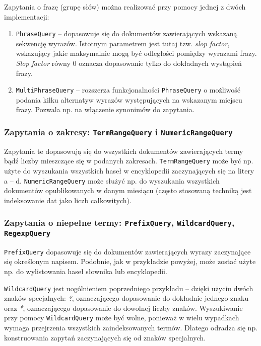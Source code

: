 Zapytania o frazę (grupę słów) można realizować przy pomocy jednej z dwóch implementacji:
\begin{enumerate}
 \item \texttt{PhraseQuery} -- dopasowuje się do dokumentów zawierających wskazaną sekwencję wyrazów. Istotnym parametrem jest tutaj tzw. \emph{slop factor}, wskazujący jakie maksymalnie mogą być odległości pomiędzy wyrazami frazy. \emph{Slop factor} równy 0 oznacza dopasowanie tylko do dokładnych wystąpień frazy. 
 \item \texttt{MultiPhraseQuery} -- rozszerza funkcjonalności \texttt{PhraseQuery} o możliwość podania kilku alternatyw wyrazów występujących na wskazanym miejscu frazy. Pozwala np. na włączenie synonimów do zapytania. 
\end{enumerate}

\subsubsection{Zapytania o zakresy: \texttt{TermRangeQuery} i \texttt{NumericRangeQuery}}

Zapytania te dopasowują się do wszystkich dokumentów zawierających termy bądź liczby mieszczące się w podanych zakresach. \texttt{TermRangeQuery} może być np. użyte do wyszukania wszystkich haseł w encyklopedii zaczynających się na litery a -- d. \texttt{NumericRangeQuery} może służyć np. do wyszukania wszystkich dokumentów opublikowanych w danym miesiącu (często stosowaną techniką jest indeksowanie dat jako liczb całkowitych).

\subsubsection{Zapytania o niepełne termy: \texttt{PrefixQuery}, \texttt{WildcardQuery}, \texttt{RegexpQuery}}

\texttt{PrefixQuery} dopasowuje się do dokumentów zawierających wyrazy zaczynające się określonym napisem. Podobnie, jak w przykładzie powyżej, może zostać użyte np. do wylistowania haseł słownika lub encyklopedii.

\texttt{WildcardQuery} jest uogólnieniem poprzedniego przykładu -- dzięki użyciu dwóch znaków specjalnych: \emph{?}, oznaczającego dopasowanie do dokładnie jednego znaku oraz \emph{*}, oznaczającego dopasowanie do dowolnej liczby znaków. Wyszukiwanie przy pomocy \texttt{WildcardQuery} może być wolne, ponieważ w wielu wypadkach wymaga przejrzenia wszystkich zaindeksowanych termów. Dlatego odradza się np. konstruowania zapytań zaczynających się od znaków specjalnych.

